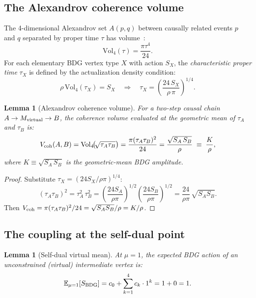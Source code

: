 \documentclass[12pt,a4paper]{article}
\newtheorem{lemma}[theorem]{Lemma}
\theoremstyle{definition}
\begin{document}
\subsection{The Alexandrov coherence volume}
\label{sec:alexandrov}

The 4-dimensional Alexandrov set $A(p,q)$ between causally related events
$p$ and $q$ separated by proper time $\tau$ has volume~\cite{Gibbons2007}:
\begin{equation}
  \label{eq:alex}
  \mathrm{Vol}_4(\tau) = \frac{\pi\tau^4}{24}.
\end{equation}
For each elementary BDG vertex type $X$ with action $S_X$, the
\emph{characteristic proper time} $\tau_X$ is defined by the actualization
density condition:
\begin{equation}
  \label{eq:tau}
  \rho\,\mathrm{Vol}_4(\tau_X) = S_X
  \quad\Longrightarrow\quad
  \tau_X = \left(\frac{24\,S_X}{\rho\,\pi}\right)^{\!1/4}.
\end{equation}

\begin{lemma}[Alexandrov coherence volume]
\label{lem:vcoh}
For a two-step causal chain $A \to M_{\rm virtual} \to B$, the
coherence volume evaluated at the geometric mean of $\tau_A$ and $\tau_B$ is:
\begin{equation}
  \label{eq:vcoh}
  V_{\rm coh}(A,B)
  = \mathrm{Vol}_4\!\bigl(\!\sqrt{\tau_A\tau_B}\bigr)
  = \frac{\pi(\tau_A\tau_B)^2}{24}
  = \frac{\sqrt{S_A\, S_B}}{\rho}
  \;\equiv\; \frac{K}{\rho},
\end{equation}
where $K \equiv \sqrt{S_A\,S_B}$ is the geometric-mean BDG amplitude.
\end{lemma}

\begin{proof}
Substitute $\tau_X = (24S_X/\rho\pi)^{1/4}$:
\[
  (\tau_A\tau_B)^2
  = \tau_A^2\,\tau_B^2
  = \left(\frac{24S_A}{\rho\pi}\right)^{\!1/2}
    \left(\frac{24S_B}{\rho\pi}\right)^{\!1/2}
  = \frac{24}{\rho\pi}\,\sqrt{S_A S_B}.
\]
Then
$V_{\rm coh} = \pi(\tau_A\tau_B)^2/24 = \sqrt{S_A S_B}/\rho = K/\rho$.
\end{proof}

\subsection{The coupling at the self-dual point}

\begin{lemma}[Self-dual virtual mean]
\label{lem:veff}
At $\mu=1$, the expected BDG action of an unconstrained (virtual)
intermediate vertex is:
\begin{equation}
  \label{eq:veff1}
  \mathbb{E}_{\mu=1}[S_{\rm BDG}]
  = c_0 + \sum_{k=1}^{4} c_k \cdot 1^k = 1 + 0 = 1.
\end{equation}
\end{lemma}
\end{document}
